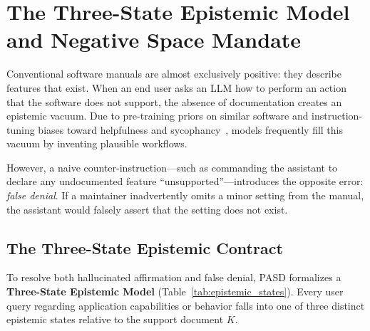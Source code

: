 \documentclass[12pt, a4paper]{article}
\begin{document}
\section{The Three-State Epistemic Model and Negative Space Mandate}
\label{sec:negative_space}

Conventional software manuals are almost exclusively positive: they describe features that exist. When an end user asks an LLM how to perform an action that the software does not support, the absence of documentation creates an epistemic vacuum. Due to pre-training priors on similar software and instruction-tuning biases toward helpfulness and sycophancy~\citep{sharma2023sycophancy, ji2023survey}, models frequently fill this vacuum by inventing plausible workflows.

However, a naive counter-instruction---such as commanding the assistant to declare any undocumented feature ``unsupported''---introduces the opposite error: \textit{false denial}. If a maintainer inadvertently omits a minor setting from the manual, the assistant would falsely assert that the setting does not exist.

\subsection{The Three-State Epistemic Contract}
To resolve both hallucinated affirmation and false denial, PASD formalizes a \textbf{Three-State Epistemic Model} (Table~\ref{tab:epistemic_states}). Every user query regarding application capabilities or behavior falls into one of three distinct epistemic states relative to the support document $K$.
\end{document}
